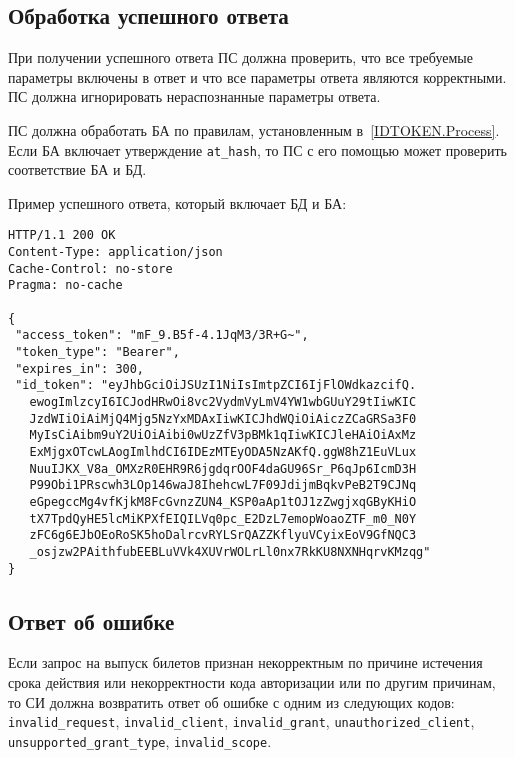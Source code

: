 \subsection{Обработка успешного ответа}\label{REQRESP.Token.Resp}

При получении успешного ответа ПС должна проверить, что все
требуемые параметры включены в ответ и что все параметры ответа являются
корректными. ПС должна игнорировать нераспознанные параметры ответа.

ПС должна обработать БА по правилам, установленным в~\ref{IDTOKEN.Process}.
%
Если БА включает утверждение \lstinline{at_hash}, то ПС с его помощью 
может проверить соответствие БА и БД.

Пример успешного ответа, который включает БД и БА:
%
\begin{lstlisting}
HTTP/1.1 200 OK
Content-Type: application/json
Cache-Control: no-store
Pragma: no-cache

{
 "access_token": "mF_9.B5f-4.1JqM3/3R+G~",
 "token_type": "Bearer",
 "expires_in": 300,
 "id_token": "eyJhbGciOiJSUzI1NiIsImtpZCI6IjFlOWdkazcifQ.
   ewogImlzcyI6ICJodHRwOi8vc2VydmVyLmV4YW1wbGUuY29tIiwKIC
   JzdWIiOiAiMjQ4Mjg5NzYxMDAxIiwKICJhdWQiOiAiczZCaGRSa3F0
   MyIsCiAibm9uY2UiOiAibi0wUzZfV3pBMk1qIiwKICJleHAiOiAxMz
   ExMjgxOTcwLAogImlhdCI6IDEzMTEyODA5NzAKfQ.ggW8hZ1EuVLux
   NuuIJKX_V8a_OMXzR0EHR9R6jgdqrOOF4daGU96Sr_P6qJp6IcmD3H
   P99Obi1PRscwh3LOp146waJ8IhehcwL7F09JdijmBqkvPeB2T9CJNq
   eGpegccMg4vfKjkM8FcGvnzZUN4_KSP0aAp1tOJ1zZwgjxqGByKHiO
   tX7TpdQyHE5lcMiKPXfEIQILVq0pc_E2DzL7emopWoaoZTF_m0_N0Y
   zFC6g6EJbOEoRoSK5hoDalrcvRYLSrQAZZKflyuVCyixEoV9GfNQC3
   _osjzw2PAithfubEEBLuVVk4XUVrWOLrLl0nx7RkKU8NXNHqrvKMzqg"
}
\end{lstlisting}

\subsection{Ответ об ошибке}\label{REQRESP.Token.Error}

Если запрос на выпуск билетов признан некорректным по причине 
истечения срока действия или некорректности кода авторизации
или по другим причинам, то СИ должна возвратить ответ об ошибке с одним из 
следующих кодов:
\lstinline{invalid_request}, %
\lstinline{invalid_client}, %
\lstinline{invalid_grant}, %
\lstinline{unauthorized_client}, %
\lstinline{unsupported_grant_type}, %
\lstinline{invalid_scope}. %
